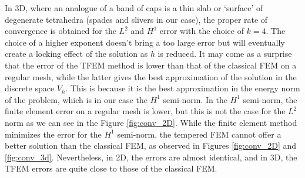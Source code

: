 \documentclass{article}
\theoremstyle{remark}
\begin{document}
In 3D, where an analogue of a band of caps is a thin slab or `surface' of degenerate tetrahedra (spades and slivers in our case), the proper rate of convergence  is obtained for the $L^2$ and $H^1$ error with the choice of $k=4$. The choice of a higher exponent doesn't bring a too large error but will eventually create a locking effect of the solution as $h$ is reduced.
It may come as a surprise that the error of the TFEM method is lower than that of the classical FEM on a regular mesh, while the latter gives the best approximation of the solution in the discrete space $V_h$. This is because it is the best approximation in the energy norm of the problem, which is in our case the $H^1$ semi-norm. In the $H^1$ semi-norm, the finite element error on a regular mesh is lower, but this is not the case for the $L^2$ norm as we can see in the Figure \ref{fig:conv_2D}.
While the finite element method minimizes the error for the $H^1$ semi-norm, the tempered FEM cannot offer a better solution than the classical FEM, as observed in Figures \ref{fig:conv_2D} and \ref{fig:conv_3d}. Nevertheless, in 2D, the errors are almost identical, and in 3D, the TFEM errors are quite close to those of the classical FEM.
\end{document}
